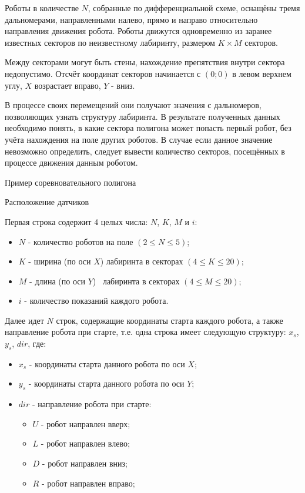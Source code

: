 
Роботы в количестве $N$, собранные по дифференциальной схеме, оснащёны тремя дальномерами, 
направленными налево, прямо и направо относительно направления движения робота. Роботы движутся 
одновременно из заранее известных секторов по неизвестному лабиринту, размером $K \times M$ секторов.

Между секторами могут быть стены, нахождение препятствия внутри сектора недопустимо. 
Отсчёт координат секторов начинается с $(0;0)$ в левом верхнем углу, $X$ возрастает вправо, $Y$ - вниз.  

В процессе своих перемещений они получают значения с дальномеров, позволяющих узнать структуру лабиринта. В результате полученных данных необходимо понять, в какие сектора полигона может попасть первый робот, без учёта нахождения на поле других роботов. В случае если данное значение невозможно определить, следует вывести количество секторов, посещённых в процессе движения данным роботом.


Пример соревновательного полигона


Расположение датчиков


Первая строка содержит 4 целых числа: $N$, $K$, $M$ и $i$:

\begin{itemize}
    \item $N$ - количество роботов на поле $(2 \leq N \leq 5)$;
    \item $K$ - ширина (по оси $ X $) лабиринта в секторах $(4 \leq K \leq 20)$;
    \item $M$ - длина (по оси $ Y $)  лабиринта в секторах $(4 \leq M \leq 20)$;
    \item $i$ - количество показаний каждого робота.
\end{itemize}

Далее идет $ N $ строк, содержащие координаты старта каждого робота, а также направление робота при старте, 
т.е. одна строка имеет следующую структуру: $x_s$, $y_s$, $dir$, где:

\begin{itemize}
    \item $x_s$ - координаты старта данного робота по оси $X$;
    \item $y_s$ - координаты старта данного робота по оси $Y$;
    \item $dir$ - направление робота при старте:
    \begin{itemize}
        \item $U$ - робот направлен вверх;
        \item $L$ - робот направлен влево;
        \item $D$ - робот направлен вниз;
        \item $R$ - робот направлен вправо;
    \end{itemize}
\end{itemize}
    

